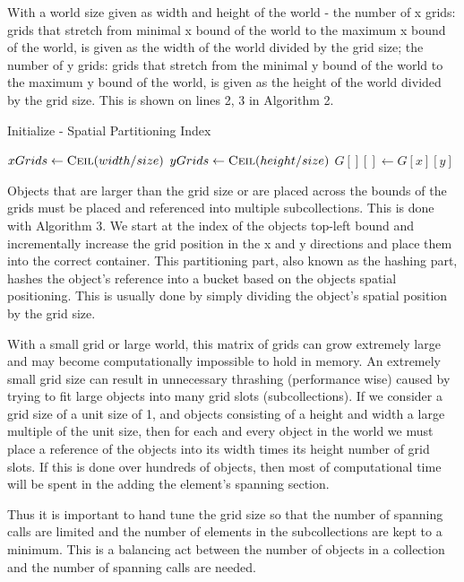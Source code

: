 \documentclass[conference]{IEEEtran}
\begin{document}
With a world size given as width and height of the world - the number of x grids: grids that stretch from minimal x bound of the world to the maximum x bound of the world, is given as the width of the world divided by the grid size; the number of y grids: grids that stretch from the minimal y bound of the world to the maximum y bound of the world, is given as the height of the world divided by the grid size. This is shown on lines 2, 3 in Algorithm 2.

\begin{algorithm}
\caption{Initialize - Spatial Partitioning Index}
\begin{algorithmic}[1]
        \State $xGrids \leftarrow \Call{Ceil}{width / size}$
        \State $yGrids \leftarrow \Call{Ceil}{height / size}$
        \State $G[][] \leftarrow G[x][y]$
\EndFunction
\end{algorithmic}
\end{algorithm}


Objects that are larger than the grid size or are placed across the bounds of the grids must be placed and referenced into multiple subcollections. This is done with Algorithm 3. We start at the index of the objects top-left bound and incrementally increase the grid position in the x and y directions and place them into the correct container. This partitioning part, also known as the hashing part, hashes the object's reference into a bucket based on the objects spatial positioning. This is usually done by simply dividing the object's spatial position by the grid size.

With a small grid or large world, this matrix of grids can grow extremely large and may become computationally impossible to hold in memory. An extremely small grid size can result in unnecessary thrashing (performance wise) caused by trying to fit large objects into many grid slots (subcollections). If we consider a grid size of a unit size of 1, and objects consisting of a height and width a large multiple of the unit size, then for each and every object in the world we must place a reference of the objects into its width times its height number of grid slots. If this is done over hundreds of objects, then most of computational time will be spent in the adding the element's spanning section.

Thus it is important to hand tune the grid size so that the number of spanning calls are limited and the number of elements in the subcollections are kept to a minimum. This is a balancing act between the number of objects in a collection and the number of spanning calls are needed.
\end{document}
